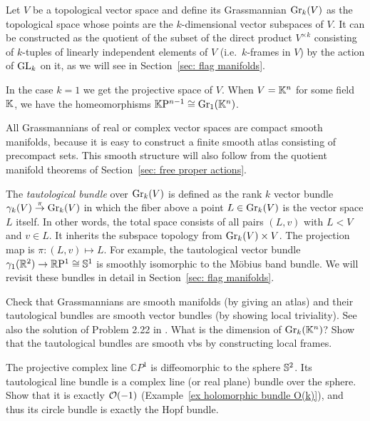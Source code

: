 \begin{example}
    Let $V$ be a topological vector space and define its Grassmannian $\operatorname{Gr}_k(V)$ as the topological space whose points are the $k$-dimensional vector subspaces of $V$. It can be constructed as the quotient of the subset of the direct product $V^{\times k}$ consisting of $k$-tuples of linearly independent elements of $V$ (i.e.\ $k$-frames in $V$) by the action of $\operatorname{GL}_k$ on it, as we will see in Section~\ref{sec: flag manifolds}.
    
    In the case $k=1$ we get the projective space of $V$. When $V=\mathbb{K}^n$ for some field $\mathbb{K}$, we have the homeomorphisms $\mathbb{K}\mathrm{P}^{n-1}\cong \operatorname{Gr}_1(\mathbb{K}^n)$.
    
    All Grassmannians of real or complex vector spaces are compact smooth manifolds, because it is easy to construct a finite smooth atlas consisting of precompact sets. This smooth structure will also follow from the quotient manifold theorems of Section~\ref{sec: free proper actions}.
    
    The \emph{tautological bundle} over $\operatorname{Gr}_k(V)$ is defined as the rank $k$ vector bundle $\gamma_{k}(V)\overset\pi\to \operatorname{Gr}_k(V)$ in which the fiber above a point $L\in \operatorname{Gr}_k(V)$ is the vector space $L$ itself. In other words, the total space consists of all pairs $(L,v)$ with $L<V$ and $v\in L$. It inherits the subspace topology from $\operatorname{Gr}_k(V)\times V$. The projection map is $\pi:(L,v)\mapsto L$.  For example, the tautological vector bundle $\gamma_1(\mathbb{R}^2)\to \mathbb{R}\mathrm{P}^1\cong \mathbb{S}^1$ is smoothly isomorphic to the M\"obius band bundle. We will revisit these bundles in detail in Section~\ref{sec: flag manifolds}.
\end{example}

\begin{xca}
    Check that Grassmannians are smooth manifolds (by giving an atlas) and their tautological bundles are smooth vector bundles (by showing local triviality). See also the solution of Problem 2.22 in \cite{Gadea}. What is the dimension of $\operatorname{Gr}_k(\mathbb{K}^n)$? Show that the tautological bundles are smooth \glspl{vb} by constructing local frames.
\end{xca}

\begin{xca}\label{xca hopf complex line bundle}
    The projective complex line $\mathbb{C}P^1$ is diffeomorphic to the sphere $\mathbb{S}^2$. Its tautological line bundle is a complex line (or real plane) bundle over the sphere. Show that it is exactly $\mathcal{O}(-1)$ (Example~\ref{ex holomorphic bundle O(k)}), and thus its circle bundle is exactly the Hopf bundle.
\end{xca}









